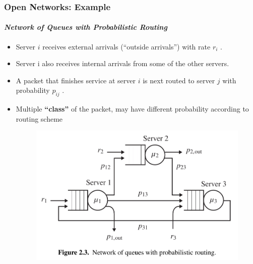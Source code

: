 \documentclass{beamer}
\begin{document}
\begin{frame}
    \frametitle{Open Networks: Example}
    \framesubtitle{\textbf{\textit{Network of Queues with Probabilistic Routing}}}
	\begin{itemize}
		\item Server $i$ receives external arrivals (“outside arrivals”) with rate $r_i$ .
		\item Server i also receives internal arrivals from some of the other servers. 
		\item A packet that ﬁnishes service at server $i$ is next routed to server $j$ with 							probability $p_{ij}$ . 
		\item Multiple \textbf{“class”} of the packet, may have different probability according to 			routing scheme
		 \begin{figure}
        		\begin{center}
		            \includegraphics[scale=0.2]{images/Networkqueueswithprobabilisticrouting.jpg}
        		\end{center}
		    \end{figure}
		  
	\end{itemize}	    
    
\end{frame}
\end{document}
